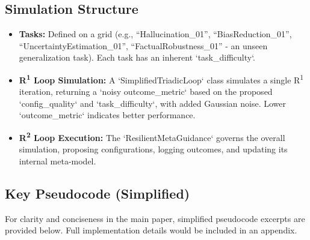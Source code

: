 \documentclass{article}
\begin{document}
\subsection{Simulation Structure}
\begin{itemize}
    \item \textbf{Tasks:} Defined on a grid (e.g., “Hallucination\_01”, “BiasReduction\_01”, “UncertaintyEstimation\_01”, “FactualRobustness\_01” - an unseen generalization task). Each task has an inherent `task_difficulty`.
    \item \textbf{R\textsuperscript{1} Loop Simulation:} A `SimplifiedTriadicLoop` class simulates a single R\textsuperscript{1} iteration, returning a `noisy outcome_metric` based on the proposed `config_quality` and `task_difficulty`, with added Gaussian noise. Lower `outcome_metric` indicates better performance.
    \item \textbf{R\textsuperscript{2} Loop Execution:} The `ResilientMetaGuidance` governs the overall simulation, proposing configurations, logging outcomes, and updating its internal meta-model.
\end{itemize}

\subsection{Key Pseudocode (Simplified)}
For clarity and conciseness in the main paper, simplified pseudocode excerpts are provided below. Full implementation details would be included in an appendix.
\end{document}
